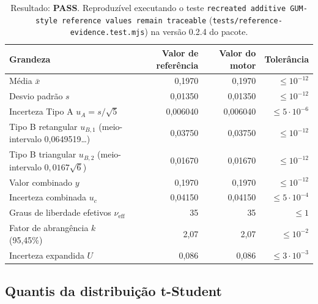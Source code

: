 \documentclass[11pt,a4paper]{article}
\newcommand{\docVersion}{0.2.4}
\begin{document}
\begin{table}[h]
  \centering
  \small
  \begin{tabularx}{\textwidth}{X r r r}
    \toprule
    \textbf{Grandeza} & \textbf{Valor de referência} & \textbf{Valor do motor} & \textbf{Tolerância} \\
    \midrule
    Média \(\bar{x}\)                                   & 0,1970                & 0,1970                & \(\leq 10^{-12}\) \\
    Desvio padrão \(s\)                                 & 0,01350               & 0,01350               & \(\leq 10^{-12}\) \\
    Incerteza Tipo A \(u_A = s/\sqrt{5}\)               & 0,006040              & 0,006040              & \(\leq 5 \cdot 10^{-6}\) \\
    Tipo B retangular \(u_{B,1}\) (meio-intervalo 0,0649519\ldots)  & 0,03750   & 0,03750   & \(\leq 10^{-12}\) \\
    Tipo B triangular \(u_{B,2}\) (meio-intervalo \(0{,}0167\sqrt{6}\)) & 0,01670 & 0,01670 & \(\leq 10^{-12}\) \\
    Valor combinado \(y\)                               & 0,1970                & 0,1970                & \(\leq 10^{-12}\) \\
    Incerteza combinada \(u_c\)                         & 0,04150               & 0,04150               & \(\leq 5 \cdot 10^{-4}\) \\
    Graus de liberdade efetivos \(\nu_\text{eff}\)      & 35                    & 35                    & \(\leq 1\) \\
    Fator de abrangência \(k\) (95,45\%)                & 2,07                  & 2,07                  & \(\leq 10^{-2}\) \\
    Incerteza expandida \(U\)                           & 0,086                 & 0,086                 & \(\leq 3 \cdot 10^{-3}\) \\
    \bottomrule
  \end{tabularx}
  \caption*{\small Resultado: \textbf{PASS}. Reproduzível executando o teste \texttt{recreated additive GUM-style reference values remain traceable} (\texttt{tests/reference-evidence.test.mjs}) na versão \docVersion{} do pacote.}
\end{table}

\subsection{Quantis da distribuição t-Student}
\end{document}

